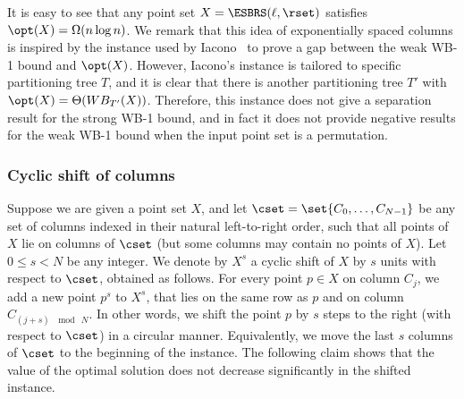 \documentclass[11pt]{article}
\numberwithin{equation}{section}
\theoremstyle{definition}
\theoremstyle{plain}
\begin{document}
It is easy to see that any point set $X= \ESBRS(\ell, \rset)$ satisfies $\opt(X) = \Omega(n \log n)$.  
We remark that this idea of exponentially spaced columns is inspired by the instance used by Iacono~\cite{in_pursuit} to prove a gap between the weak WB-1 bound and $\opt(X)$.  
However, Iacono's instance is tailored to specific partitioning tree $T$, and it is clear that there is another partitioning tree $T'$ with $\opt(X) = \Theta(WB_{T'}(X))$.
Therefore, this instance does not give a separation result for the strong WB-1 bound, and in fact it does not provide negative results for the weak WB-1 bound when the input point set is a permutation.    



\subsubsection{Cyclic shift of columns}


Suppose we are given a point set $X$, and let $\cset=\set{C_0,\ldots,C_{N-1}}$ be any set of columns indexed in their natural left-to-right order, such that all points of $X$ lie on columns of $\cset$ (but some columns may contain no points of $X$).
Let $0\leq s<N$ be any integer. We denote by $X^s$ a cyclic shift of $X$ by $s$ units with respect to $\cset$, obtained as follows. 
For every point $p\in X$ on column $C_j$, we add a new point $p^s$ to $X^s$, that lies on the same row as $p$ and on column $C_{(j+s)~\mod~N}$.  
In other words, we shift the point $p$ by $s$ steps to the right (with respect to $\cset$) in a circular manner. Equivalently, we move the last $s$ columns of $\cset$ to the beginning of the instance.
The following claim shows that the value of the optimal solution does not decrease significantly in the shifted instance.
\end{document}
